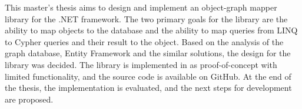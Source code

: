 This master's thesis aims to design and implement an object-graph mapper library for the .NET framework.
The two primary goals for the library are the ability to map objects to the database and the ability to map queries from LINQ to Cypher queries and their result to the object.
Based on the analysis of the graph database, Entity Framework and the similar solutions, the design for the library was decided.
The library is implemented in \CS as proof-of-concept with limited functionality, and the source code is available on GitHub.
At the end of the thesis, the implementation is evaluated, and the next steps for development are proposed.